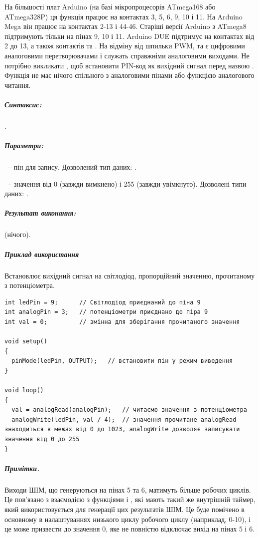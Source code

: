 \documentclass[12pt,a4paper]{report}  %
\begin{document}
На більшості плат Arduino (на базі мікропроцесорів ATmega168 або ATmega328P) ця функція працює на контактах 3, 5, 6, 9, 10 і 11. На Arduino Mega він працює на контактах 2-13 і 44-46. Старіші версії Arduino з ATmega8 підтримують  тільки на пінах 9, 10 і 11.
Arduino DUE підтримує  на контактах від 2 до 13, а також контактів  та . На відміну від шпильки PWM,  та  є цифровими аналоговими перетворювачами і служать справжніми аналоговими виходами.
Не потрібно викликати , щоб встановити PIN-код як вихідний сигнал перед назвою .
Функція  не має нічого спільного з аналоговими пінами або функцією аналогового читання.

\subparagraph{Синтаксис:} .

\subparagraph{Параметри:}
~-- пін для запису. Дозволений тип даних: .

~-- значення від 0 (завжди вимкнено) і 255 (завжди увімкнуто). Дозволені типи даних: .

\subparagraph{Результат виконання:}  (нічого).

\subparagraph{Приклад використання}

Встановлює вихідний сигнал на світлодіод, пропорційний значенню, прочитаному з потенціометра.

\begin{lstlisting}[label=digitalwrite,caption=analogWrite]	
int ledPin = 9;      // Світлодіод приєднаний до піна 9
int analogPin = 3;   // потенціометри приєднано до піра 9
int val = 0;         // змінна для зберігання прочитаного значення

void setup()
{
  pinMode(ledPin, OUTPUT);   // встановити пін у режим виведення
}

void loop()
{
  val = analogRead(analogPin);   // читаємо значення з потенціометра
  analogWrite(ledPin, val / 4);  // значення прочитане analogRead знаходиться в межах від 0 до 1023, analogWrite дозволяє записувати значення від 0 до 255
}
\end{lstlisting}

\subparagraph{Примітки.} Виходи ШІМ, що генеруються на пінах 5 та 6, матимуть більше робочих циклів. Це пов'язано з взаємодією з функціями  і , які мають такий же внутрішній таймер, який використовується для генерації цих результатів ШІМ. Це буде помічено в основному в налаштуваннях низького циклу робочого циклу (наприклад, 0-10), і це може призвести до значення 0, яке не повністю відключає вихід на пінах 5 і 6.
\end{document}
